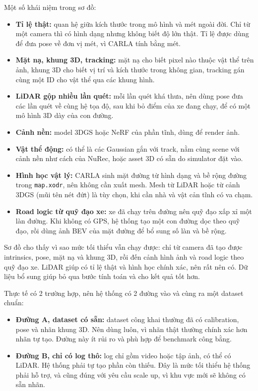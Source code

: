 Một số khái niệm trong sơ đồ:
\begin{itemize}
  \item \textbf{Tỉ lệ thật:} quan hệ giữa kích thước trong mô hình và mét ngoài đời. Chỉ từ một camera thì có hình dạng nhưng không biết độ lớn thật. Tỉ lệ được dùng để đưa pose về đơn vị mét, vì CARLA tính bằng mét.
  \item \textbf{Mặt nạ, khung 3D, tracking:} mặt nạ cho biết pixel nào thuộc vật thể trên ảnh, khung 3D cho biết vị trí và kích thước trong không gian, tracking gán cùng một ID cho vật thể qua các khung hình.
  \item \textbf{LiDAR gộp nhiều lần quét:} mỗi lần quét khá thưa, nên dùng pose đưa các lần quét về cùng hệ tọa độ, sau khi bỏ điểm của xe đang chạy, để có một mô hình 3D dày của con đường.
  \item \textbf{Cảnh nền:} model 3DGS hoặc NeRF của phần tĩnh, dùng để render ảnh.
  \item \textbf{Vật thể động:} có thể là các Gaussian gắn với track, nằm cùng scene với cảnh nền như cách của NuRec, hoặc asset 3D có sẵn do simulator đặt vào.
  \item \textbf{Hình học vật lý:} CARLA sinh mặt đường từ hình dạng và bề rộng đường trong \texttt{map.xodr}, nên không cần xuất mesh. Mesh từ LiDAR hoặc từ cảnh 3DGS (mũi tên nét đứt) là tùy chọn, khi cần nhà và vật cản tĩnh có va chạm.
  \item \textbf{Road logic từ quỹ đạo xe:} xe đã chạy trên đường nên quỹ đạo xấp xỉ một làn đường. Khi không có GPS, hệ thống tạo một con đường dọc theo quỹ đạo, rồi dùng ảnh BEV của mặt đường để bổ sung số làn và bề rộng.
\end{itemize}

Sơ đồ cho thấy vì sao mức tối thiểu vẫn chạy được: chỉ từ camera đã tạo được intrinsics, pose, mặt nạ và khung 3D, rồi đến cảnh hình ảnh và road logic theo quỹ đạo xe.
LiDAR giúp có tỉ lệ thật và hình học chính xác, nên rất nên có. Dữ liệu bổ sung giúp bỏ qua bước tính toán và cho kết quả tốt hơn.

Thực tế có 2 trường hợp, nên hệ thống có 2 đường vào và cùng ra một dataset chuẩn:
\begin{itemize}
  \item \textbf{Đường A, dataset có sẵn:} dataset công khai thường đã có calibration, pose và nhãn khung 3D. Nên dùng luôn, vì nhãn thật thường chính xác hơn nhãn tự tạo. Đường này ít rủi ro và phù hợp để benchmark công bằng.
  \item \textbf{Đường B, chỉ có log thô:} log chỉ gồm video hoặc tập ảnh, có thể có LiDAR. Hệ thống phải tự tạo phần còn thiếu. Đây là mức tối thiểu hệ thống phải hỗ trợ, và cũng đúng với yêu cầu scale up, vì khu vực mới sẽ không có sẵn nhãn.
\end{itemize}


